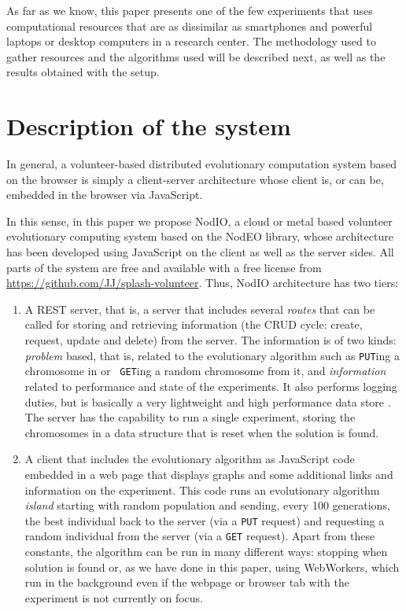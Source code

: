 \documentclass[journal,onecolumn]{IEEEtran}
\begin{document}
As far as we know, this paper presents one of the few experiments that
uses computational resources that are as dissimilar as smartphones and
powerful laptops 
or desktop computers in a research center. The methodology used to
gather resources and the algorithms used will be described next, as
well as the results obtained with the setup.

\section{Description of the system}
\label{sec:description}

In general, a volunteer-based distributed evolutionary computation
system based on the browser is simply a client-server architecture
whose client is, or can be, embedded in the browser via JavaScript.

In this sense, in this paper we propose {\sf NodIO}, a cloud or metal
based 
volunteer evolutionary computing system based on the {\sf NodEO}
library, whose architecture 
has been developed using JavaScript on the client as well as the
server sides. 
All parts of the system are free and available with a free
license from \url{https://github.com/JJ/splash-volunteer}.
Thus, {\sf NodIO} architecture has two tiers:\begin{enumerate}
\item A REST server, that is, a server that includes several {\em
  routes} %
  that can be called for storing and retrieving information (the CRUD cycle:
  create, request, update and delete) from the server. The information
  is of two kinds: {\em problem} based, that is, related to the
  evolutionary algorithm such as {\tt PUT}ing a chromosome in or {\tt
    GET}ing a random chromosome from it, and {\em information} related
  to performance and state of the experiments. It also performs logging
  duties, but is basically a very lightweight and high performance
  data store \cite{jj:idc:lowcost}.
  The server has the capability to
  run a single experiment, storing the chromosomes in a data structure
  that is reset when the solution is found.
\item A client that includes the evolutionary algorithm as
  JavaScript code embedded in a web page that displays graphs and some
  additional links and information on the experiment. This code runs
  an evolutionary algorithm {\em island} starting with random
  population and sending, every 100 generations, the best individual
  back to the server (via a {\tt PUT} request) and requesting a random
  individual from the server (via a {\tt GET} request). Apart from
  these constants, the algorithm can be run in many different ways:
  stopping when solution is found or, as we have done in this paper,
  using WebWorkers, which run in the background even if the webpage or
  browser tab with the experiment is not currently on focus.
\end{enumerate}
\end{document}
